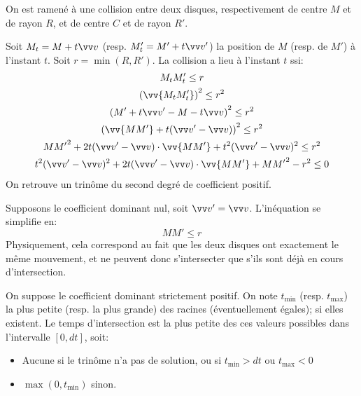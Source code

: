\documentclass[a4paper]{article}
\begin{document}
On est ramené à une collision entre deux disques, respectivement de centre $M$ et de rayon $R$,
et de centre $C$ et de rayon $R'$.

Soit $M_t = M + t\vv v$ (resp. $M_t' = M' + t\vv v'$) la position de $M$
(resp. de $M'$) à l'instant $t$. Soit $r = \min(R,R')$. La collision a lieu à l'instant $t$ ssi:
\begin{gather*}
  M_tM_t' \leq r \\
  \left( \vv{M_t M_t'} \right)^2 \leq r^2 \\
  \left( M' + t\vv v' - M - t \vv v \right)^2 \leq r^2 \\
  \left( \vv{MM'} + t(\vv v' - \vv v) \right)^2 \leq r^2 \\
  {MM'}^2 + 2t(\vv v' - \vv v)\cdot \vv{MM'} + t^2 (\vv v' - \vv v)^2 \leq r^2 \\
  t^2 (\vv v' - \vv v)^2 + 2t(\vv v' - \vv v)\cdot \vv{MM'} + {MM'}^2 - r^2 \leq 0 \\
\end{gather*}
On retrouve un trinôme du second degré de coefficient positif.

Supposons le coefficient dominant nul, soit $\vv v' = \vv v$. L'inéquation se simplifie en:
\[
  MM' \leq r
\]
Physiquement, cela correspond au fait que les deux disques ont exactement le même mouvement,
et ne peuvent donc s'intersecter que s'ils sont déjà en cours d'intersection.

On suppose le coefficient dominant strictement positif. On note $t_{\text{min}}$
(resp. $t_{\text{max}}$) la plus petite (resp. la plus grande) des racines (éventuellement égales);
si elles existent.
Le temps d'intersection est la plus petite des ces valeurs possibles dans l'intervalle $[0,dt]$,
soit:
\begin{itemize}
  \item Aucune si le trinôme n'a pas de solution, ou si $t_\text{min} > dt$ ou $t_\text{max} < 0$
  \item $\max(0, t_\text{min})$ sinon.
\end{itemize}
\end{document}
